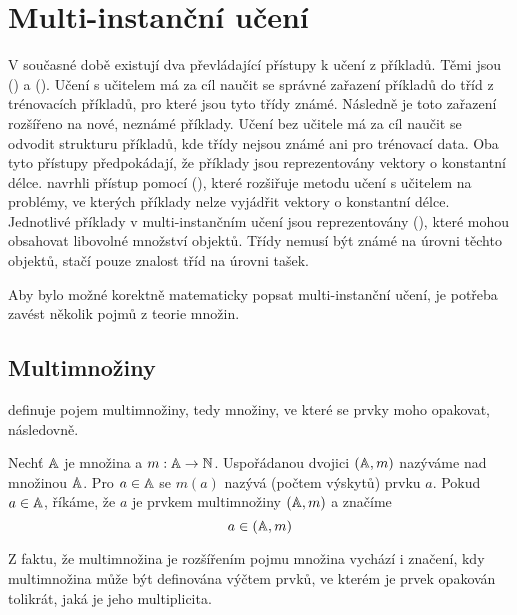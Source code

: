 \chapter{Multi-instanční učení}\label{MIL}

V současné době existují dva převládající přístupy k učení z příkladů. Těmi jsou  () a  (). Učení s učitelem má za cíl naučit se správné zařazení příkladů do tříd z trénovacích příkladů, pro které jsou tyto třídy známé. Následně je toto zařazení rozšířeno na nové, neznámé příklady. Učení bez učitele má za cíl naučit se odvodit strukturu příkladů, kde třídy nejsou známé ani pro trénovací data. Oba tyto přístupy předpokádají, že příklady jsou reprezentovány vektory o konstantní délce. \cite{dietterich_solving_1997} navrhli přístup pomocí  (), které rozšiřuje metodu učení s učitelem na problémy, ve kterých příklady nelze vyjádřit vektory o konstantní délce. Jednotlivé příklady v multi-instančním učení jsou reprezentovány  (), které mohou obsahovat libovolné množství objektů. Třídy nemusí být známé na úrovni těchto objektů, stačí pouze znalost tříd na úrovni tašek.

Aby bylo možné korektně matematicky popsat multi-instanční učení, je potřeba zavést několik pojmů z teorie množin.

\section{Multimnožiny}
\cite{knuth_art_1968} definuje pojem multimnožiny, tedy množiny, ve které se prvky moho opakovat, následovně.

\begin{define}
	Nechť \( \mathbb A \) je množina a \( m : \mathbb A \to \mathbb N \).
	Uspořádanou dvojici \( \left( \mathbb A, m \right) \) nazýváme  nad množinou \( \mathbb A \). Pro \( a \in \mathbb A \) se \( m \left( a \right) \) nazývá  (počtem výskytů) prvku \( a \). Pokud \( a \in \mathbb A \), říkáme, že \( a \) je prvkem multimnožiny \( \left( \mathbb A, m \right) \) a značíme 
	\[ a \in \left( \mathbb A, m \right) \]
\end{define}

Z faktu, že multimnožina je rozšířením pojmu množina vychází i značení, kdy multimnožina může být definována výčtem prvků, ve kterém je prvek opakován tolikrát, jaká je jeho multiplicita.


